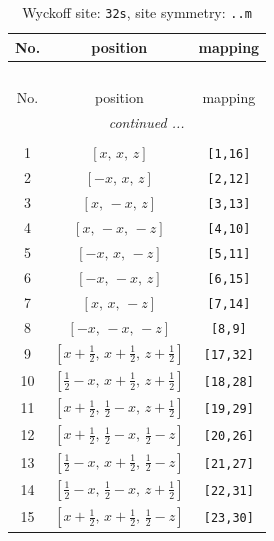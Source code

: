 \documentclass[fleqn,8pt]{jsarticle}
\begin{document}
\begin{longtable}{ccc}
\caption{Wyckoff site: {\tt 32s}, site symmetry: {\tt ..m}}
 \\
 \hline \hline
No. & position & mapping \\ \hline \endfirsthead

\multicolumn{2}{l}{\tablename\ \thetable{}} \\
 \hline \hline
No. & position & mapping \\ \hline \endhead

 \hline \hline
\multicolumn{2}{r}{\footnotesize\it continued ...} \\ \endfoot

 \hline \hline
\multicolumn{2}{r}{} \\ \endlastfoot

1 & $\left[ x,\, x,\, z \right]$ & {\tt [1,16]} \\ \hline
2 & $\left[ - x,\, x,\, z \right]$ & {\tt [2,12]} \\ \hline
3 & $\left[ x,\, - x,\, z \right]$ & {\tt [3,13]} \\ \hline
4 & $\left[ x,\, - x,\, - z \right]$ & {\tt [4,10]} \\ \hline
5 & $\left[ - x,\, x,\, - z \right]$ & {\tt [5,11]} \\ \hline
6 & $\left[ - x,\, - x,\, z \right]$ & {\tt [6,15]} \\ \hline
7 & $\left[ x,\, x,\, - z \right]$ & {\tt [7,14]} \\ \hline
8 & $\left[ - x,\, - x,\, - z \right]$ & {\tt [8,9]} \\ \hline
9 & $\left[ x + \frac{1}{2},\, x + \frac{1}{2},\, z + \frac{1}{2} \right]$ & {\tt [17,32]} \\ \hline
10 & $\left[ \frac{1}{2} - x,\, x + \frac{1}{2},\, z + \frac{1}{2} \right]$ & {\tt [18,28]} \\ \hline
11 & $\left[ x + \frac{1}{2},\, \frac{1}{2} - x,\, z + \frac{1}{2} \right]$ & {\tt [19,29]} \\ \hline
12 & $\left[ x + \frac{1}{2},\, \frac{1}{2} - x,\, \frac{1}{2} - z \right]$ & {\tt [20,26]} \\ \hline
13 & $\left[ \frac{1}{2} - x,\, x + \frac{1}{2},\, \frac{1}{2} - z \right]$ & {\tt [21,27]} \\ \hline
14 & $\left[ \frac{1}{2} - x,\, \frac{1}{2} - x,\, z + \frac{1}{2} \right]$ & {\tt [22,31]} \\ \hline
15 & $\left[ x + \frac{1}{2},\, x + \frac{1}{2},\, \frac{1}{2} - z \right]$ & {\tt [23,30]} \\ \hline

\end{longtable}
\end{document}

